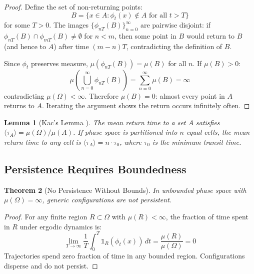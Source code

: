 \documentclass[11pt,a4paper]{article}
\newtheorem{theorem}{Theorem}[section]
\newtheorem{lemma}[theorem]{Lemma}
\theoremstyle{definition}
\theoremstyle{remark}
\begin{document}
\begin{proof}
Define the set of non-returning points:
\begin{equation}
B = \{x \in A : \phi_t(x) \notin A \text{ for all } t > T\}
\end{equation}
for some $T > 0$. The images $\{\phi_{nT}(B)\}_{n=0}^\infty$ are pairwise disjoint: if $\phi_{nT}(B) \cap \phi_{mT}(B) \neq \emptyset$ for $n < m$, then some point in $B$ would return to $B$ (and hence to $A$) after time $(m-n)T$, contradicting the definition of $B$.

Since $\phi_t$ preserves measure, $\mu(\phi_{nT}(B)) = \mu(B)$ for all $n$. If $\mu(B) > 0$:
\begin{equation}
\mu\left(\bigcup_{n=0}^\infty \phi_{nT}(B)\right) = \sum_{n=0}^\infty \mu(B) = \infty
\end{equation}
contradicting $\mu(\Omega) < \infty$. Therefore $\mu(B) = 0$: almost every point in $A$ returns to $A$. Iterating the argument shows the return occurs infinitely often.
\end{proof}

\begin{lemma}[Kac's Lemma \citep{kac1947}]
\label{lem:kac}
The mean return time to a set $A$ satisfies $\langle \tau_A \rangle = \mu(\Omega)/\mu(A)$. If phase space is partitioned into $n$ equal cells, the mean return time to any cell is $\langle \tau_A \rangle = n \cdot \tau_0$, where $\tau_0$ is the minimum transit time.
\end{lemma}

\subsection{Persistence Requires Boundedness}

\begin{theorem}[No Persistence Without Bounds]
\label{thm:no_persistence}
In unbounded phase space with $\mu(\Omega) = \infty$, generic configurations are not persistent.
\end{theorem}

\begin{proof}
For any finite region $R \subset \Omega$ with $\mu(R) < \infty$, the fraction of time spent in $R$ under ergodic dynamics is:
\begin{equation}
\lim_{T \to \infty} \frac{1}{T} \int_0^T \mathbb{1}_R(\phi_t(x)) \, dt = \frac{\mu(R)}{\mu(\Omega)} = 0
\end{equation}
Trajectories spend zero fraction of time in any bounded region. Configurations disperse and do not persist.
\end{proof}
\end{document}
